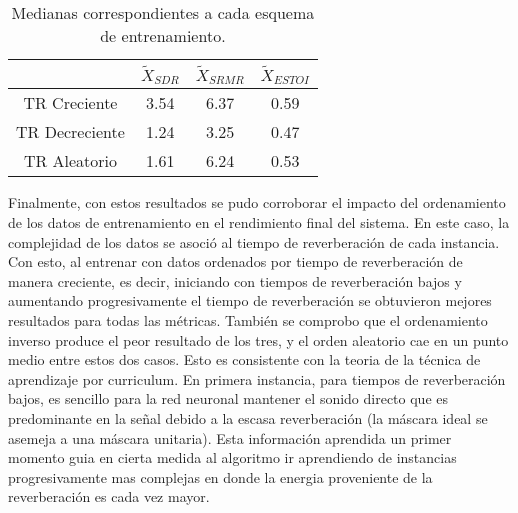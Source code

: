 \begin{table}[H]
\centering
\caption{Medianas correspondientes a cada esquema de entrenamiento.}
\begin{tabular}{|c|c|c|c|}
\hline
               & \textbf{$\tilde{X}_{SDR}$} & \textbf{$\tilde{X}_{SRMR}$} & \textbf{$\tilde{X}_{ESTOI}$} \\ \hline
TR Creciente   & 3.54         & 6.37          & 0.59           \\ \hline
TR Decreciente & 1.24         & 3.25          & 0.47           \\ \hline
TR Aleatorio   & 1.61         & 6.24          & 0.53           \\ \hline
\end{tabular}
\label{table:resultados_reverb}
\end{table}

Finalmente, con estos resultados se pudo corroborar el impacto del ordenamiento de los datos de entrenamiento en el rendimiento final del sistema. En este caso, la complejidad de los datos se asoció al tiempo de reverberación de cada instancia. Con esto, al entrenar con datos ordenados por tiempo de reverberación de manera creciente, es decir, iniciando con tiempos de reverberación bajos y aumentando progresivamente el tiempo de reverberación se obtuvieron mejores resultados para todas las métricas. También se comprobo que el ordenamiento inverso produce el peor resultado de los tres, y el orden aleatorio cae en un punto medio entre estos dos casos. Esto es consistente con la teoria de la técnica de aprendizaje por curriculum. En primera instancia, para tiempos de reverberación bajos, es sencillo para la red neuronal mantener el sonido directo que es predominante en la señal debido a la escasa reverberación (la máscara ideal se asemeja a una máscara unitaria). Esta información aprendida un primer momento guia en cierta medida al algoritmo ir aprendiendo de instancias progresivamente mas complejas en donde la energia proveniente de la reverberación es cada vez mayor. 
